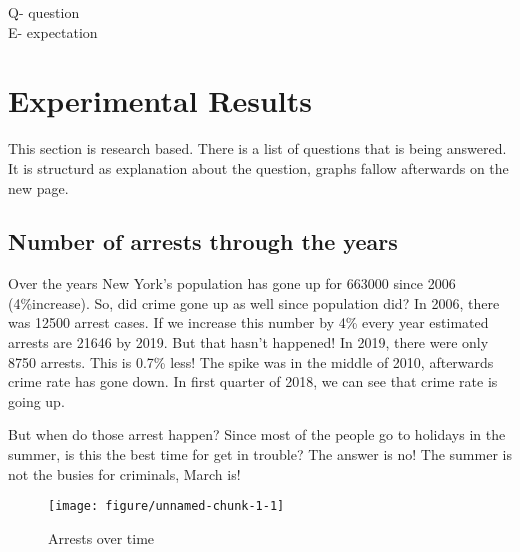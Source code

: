 \documentclass{article}\usepackage[]{graphicx}\usepackage[]{color}
\makeatletter
\def\maxwidth{ %
  \ifdim\Gin@nat@width>\linewidth
    \linewidth
  \else
    \Gin@nat@width
  \fi
}
\newenvironment{knitrout}{}{} %
\makeatother
\begin{document}
       \noindent Q- question\\
        E- expectation 
          
  \maketitle
    \newpage
      \section{Experimental Results} 
      This section is research based. There is a list of questions that is being answered. It is structurd       as explanation about the question, graphs fallow afterwards on the new page. 

    \newpage
      \subsection{Number of arrests through  the years}
        Over the years New York’s population has gone up for 663000 since 2006 (4\%increase). So, did             crime gone up as well since population did? 
        In 2006, there was 12500 arrest cases. If we increase this number by 4\% every year estimated             arrests are 21646 by 2019. But that hasn’t happened! In 2019, there were only 8750 arrests. This          is 0.7\% less! The spike was in the middle of 2010, afterwards crime rate has gone down. In first         quarter of 2018, we can see that crime rate is going up.\
        
        But when do those arrest happen? Since most of the people go to holidays in the summer, is this           the best time for get in trouble? The answer is no! The summer is not the busies for criminals,           March is!
        
        \begin{figure}[hbtp]
          \caption{Arrests over time}
\begin{knitrout}
\color{fgcolor}
\texttt{[image: figure/unnamed-chunk-1-1]} 

\end{knitrout}
        \end{figure}
          
\end{document}
